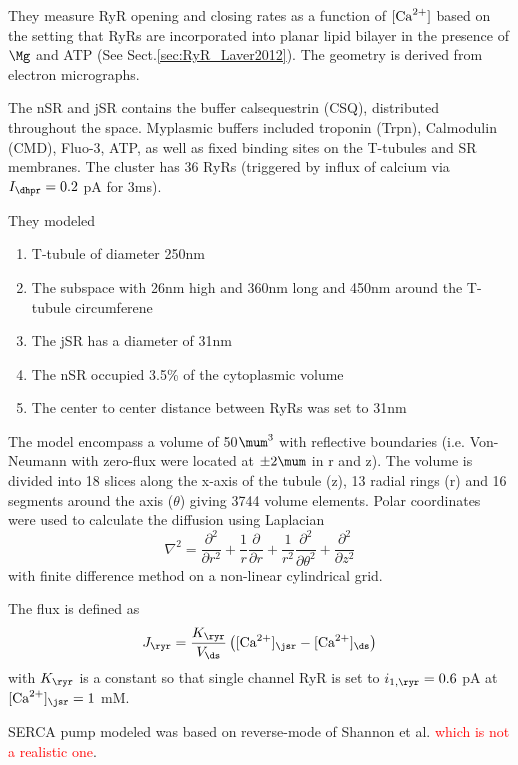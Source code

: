 They measure RyR opening and closing rates as a function of $[{\text{Ca}^{2+}}]$ based on
the setting that RyRs are incorporated into planar lipid bilayer in the presence
of $\Mg$ and ATP (See Sect.\ref{sec:RyR_Laver2012}). The geometry is
derived from electron micrographs.

The nSR and jSR contains the buffer calsequestrin (CSQ), distributed throughout
the space. Myplasmic buffers included troponin (Trpn), Calmodulin (CMD), Fluo-3,
ATP, as well as fixed binding sites on the T-tubules and SR membranes. The
cluster has 36 RyRs (triggered by influx of calcium via $I_\dhpr=0.2$ pA for
3ms). 

They modeled 
\begin{enumerate}
  \item T-tubule of diameter 250nm \citep{}
  \item The subspace with 26nm high
\citep{} and 360nm long and 450nm around the T-tubule circumferene
   \item The jSR has a diameter of 31nm
   \item The nSR occupied 3.5\% of the cytoplasmic volume \citep{}
   \item The center to center distance between RyRs was set to 31nm \citep{}
\end{enumerate}

The model encompass a volume of 50$\mum^3$ with reflective boundaries (i.e.
Von-Neumann with zero-flux were located at $\pm 2\mum$ in r and z).
The volume is divided into 18 slices along the x-axis of the tubule (z), 13
radial rings (r) and 16 segments around the axis ($\theta$) giving 3744 volume
elements. Polar coordinates were used to calculate the diffusion using Laplacian
\begin{equation}
\nabla^2 = \frac{\partial ^2}{\partial r^2} +
\frac{1}{r}\frac{\partial}{\partial r} +
\frac{1}{r^2}\frac{\partial^2}{\partial \theta^2} + \frac{\partial^2}{\partial
z^2}
\end{equation}
with finite difference method on a non-linear cylindrical grid. 


The flux is defined as
\begin{equation}
J_\ryr = \frac{K_\ryr}{V_\ds} \left( [\Ca]_\jsr - [\Ca]_\ds \right)
\end{equation}
with $K_\ryr$ is a constant so that single channel RyR is set to
$i_{1,\ryr}=0.6$ pA \citep{17,18} at $[\Ca]_\jsr = 1$ mM.

SERCA pump modeled was based on reverse-mode of Shannon et al. \citep{}
\textcolor{red}{which is not a realistic one}. 

